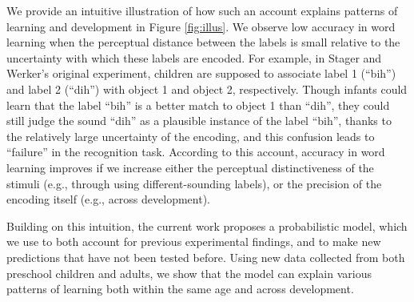 \documentclass[10pt, letterpaper]{article}
\begin{document}
We provide an intuitive illustration of how such an account explains
patterns of learning and development in Figure \ref{fig:illus}. We
observe low accuracy in word learning when the perceptual distance
between the labels is small relative to the uncertainty with which these
labels are encoded. For example, in Stager and Werker's original
experiment, children are supposed to associate label 1 (``bih'') and
label 2 (``dih'') with object 1 and object 2, respectively. Though
infants could learn that the label ``bih'' is a better match to object 1
than ``dih'', they could still judge the sound ``dih'' as a plausible
instance of the label ``bih'', thanks to the relatively large
uncertainty of the encoding, and this confusion leads to ``failure'' in
the recognition task. According to this account, accuracy in word
learning improves if we increase either the perceptual distinctiveness
of the stimuli (e.g., through using different-sounding labels), or the
precision of the encoding itself (e.g., across development).

Building on this intuition, the current work proposes a probabilistic
model, which we use to both account for previous experimental findings,
and to make new predictions that have not been tested before. Using new
data collected from both preschool children and adults, we show that the
model can explain various patterns of learning both within the same age
and across development.
\end{document}
